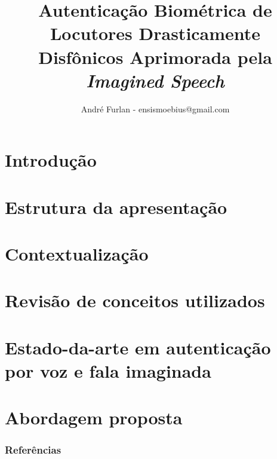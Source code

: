 

\title{Autenticação Biométrica de Locutores Drasticamente Disfônicos Aprimorada pela \textit{Imagined Speech}}


\author{André Furlan - ensismoebius@gmail.com}

\date{\the\year}


	
	\frame{\titlepage}
	
	\section{Introdução}
		
		
	\section{Estrutura da apresentação}
		

	\section{Contextualização}
		

	\section{Revisão de conceitos utilizados}
		
		
		
		
		
		
		
		
		
		
		
	
	\section{Estado-da-arte em autenticação por voz e fala imaginada}
		

	\section{Abordagem proposta}
		
		
	
	\begin{frame}[allowframebreaks]
		\frametitle{Referências}
		
	\end{frame}
	
